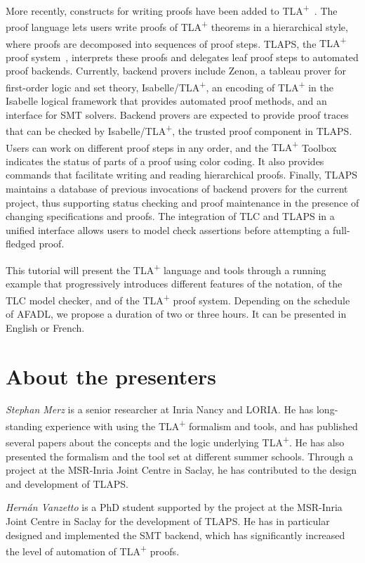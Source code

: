 \documentclass[a4paper]{article}
\newcommand{\tlaplus}{{\upshape TLA\textsuperscript{+}}}
\begin{document}
More recently, constructs for writing proofs have been added to
\tlaplus~\cite{cousineau:tla-proofs}. The proof language lets users write proofs
of \tlaplus{} theorems in a hierarchical style, where proofs are decomposed into
sequences of proof steps. TLAPS, the \tlaplus{} proof
system~\cite{chaudhuri:tlaps}, interprets these proofs and delegates leaf proof
steps to automated proof backends. Currently, backend provers include
Zenon, %
a tableau prover for first-order logic and set theory, Isabelle/\tlaplus{}, an
encoding of \tlaplus{} in the Isabelle logical
framework %
that provides automated proof methods, and an interface for SMT
solvers. %
Backend provers are expected to provide proof traces that can be checked by
Isabelle/\tlaplus{}, the trusted proof component in TLAPS. Users can work on
different proof steps in any order, and the \tlaplus{} Toolbox indicates the
status of parts of a proof using color coding. It also provides commands that
facilitate writing and reading hierarchical proofs. Finally, TLAPS maintains a
database of previous invocations of backend provers for the current project,
thus supporting status checking and proof maintenance in the presence of
changing specifications and proofs. The integration of TLC and TLAPS in a
unified interface allows users to model check assertions before attempting a
full-fledged proof.

\bigskip

\noindent%
This tutorial will present the \tlaplus{} language and tools through a running
example that progressively introduces different features of the notation, of the
TLC model checker, and of the \tlaplus{} proof system. Depending on the schedule
of AFADL, we propose a duration of two or three hours. It can be presented in
English or French.


\section{About the presenters}

\emph{Stephan Merz} is a senior researcher at Inria Nancy and LORIA. He has
long-standing experience with using the \tlaplus{} formalism and tools, and has
published several papers about the concepts and the logic underlying \tlaplus{}.
He has also presented the formalism and the tool set at different summer schools.
Through a project at the MSR-Inria Joint Centre in Saclay, he has contributed to
the design and development of TLAPS.

\medskip

\noindent%
\emph{Hernán Vanzetto} is a PhD student supported by the project at the
MSR-Inria Joint Centre in Saclay for the development of TLAPS. He has in
particular designed and implemented the SMT backend, which has significantly
increased the level of automation of \tlaplus{} proofs.




\end{document}
